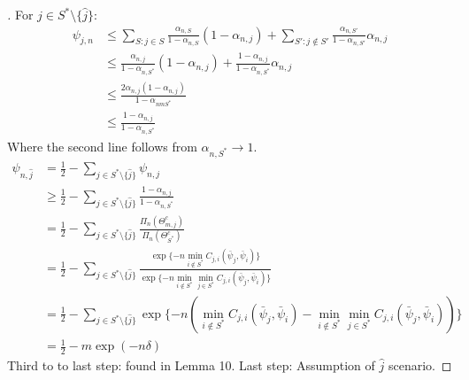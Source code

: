   \begin{proof}[]
    For $j \in S^* \setminus \{\hat{j}\}$:
    \begin{align}
      \psi_{j, n} &\leq \sum_{S: j \in S} \frac{\alpha_{n, S}}{1 - \alpha_{n,
          S}}(1 - \alpha_{n, j})+ \sum_{S': j \notin S'} \frac{\alpha_{n,
          S'}}{{1 - \alpha_{n, S'}}}\alpha_{n, j} \\
        &\leq \frac{\alpha_{n, j}}{1 - \alpha_{n, S^*}}(1 - \alpha_{n, j}) +
            \frac{1 - \alpha_{n, j}}{1 - \alpha_{n, S^*}} \alpha_{n, j} \\
        &\leq \frac{2 \alpha_{n, j}(1 - \alpha_{n, j})}{1 - \alpha_{nm S^*}} \\
        &\leq \frac{1 - \alpha_{n, j}}{1 - \alpha_{n, S^*}}
    \end{align}
    Where the second line follows from $\alpha_{n, S^*} \rightarrow 1$.
    \begin{align}
      \psi_{n, \hat{j}} &= \frac{1}{2} - \sum_{j \in S^* \setminus \{\hat{j}\}}
          \psi_{n, j}\\
        &\geq \frac{1}{2} - \sum_{j \in S^* \setminus \{\hat{j}\}} \frac{1 -
            \alpha_{n, j}}{1 - \alpha_{n, S^*}} \\
        &= \frac{1}{2} - \sum_{j \in S^* \setminus \{\hat{j}\}}
            \frac{\Pi_n(\Theta_{m, j}^c)}{\Pi_n(\Theta_{S^*}^c)} \\
        &= \frac{1}{2} - \sum_{j \in S^* \setminus \{\hat{j}\}} \frac{\exp\{-n
            \min_{i \notin S^*} C_{j, i}(\bar{\psi}_j, \bar{\psi}_i) \}}{\exp\{-
            n \min_{i \notin S^*} \min_{j \in S^*} C_{j, i}(\bar{\psi}_j,
            \bar{\psi}_i) \}}\\
        &= \frac{1}{2} - \sum_{j \in S^* \setminus \{\hat{j}\}} \exp\{-
            n(\min_{i \notin S^*} C_{j, i}(\bar{\psi}_j, \bar{\psi}_i) -
            \min_{i \notin S^*} \min_{j \in S^*} C_{j, i}(\bar{\psi}_j,
            \bar{\psi}_i))\} \\
        &= \frac{1}{2} - m \exp(-n\delta)
    \end{align}
    Third to to last step: found in Lemma 10.
    Last step: Assumption of $\hat{j}$ scenario.
  \end{proof}
